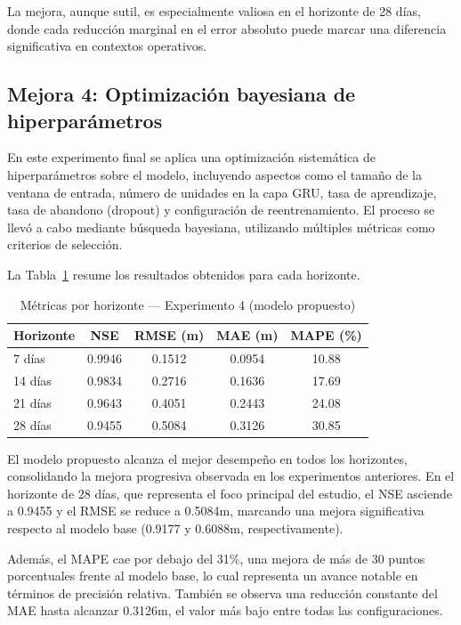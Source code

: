 La mejora, aunque sutil, es especialmente valiosa en el horizonte de 28 días, donde cada reducción marginal en el error absoluto puede marcar una diferencia significativa en contextos operativos.


\subsection{Mejora 4: Optimización bayesiana de hiperparámetros}
\label{ssec:exp4}

En este experimento final se aplica una optimización sistemática de hiperparámetros sobre el modelo, incluyendo aspectos como el tamaño de la ventana de entrada, número de unidades en la capa GRU, tasa de aprendizaje, tasa de abandono (dropout) y configuración de reentrenamiento. El proceso se llevó a cabo mediante búsqueda bayesiana, utilizando múltiples métricas como criterios de selección.

La Tabla~\ref{tab:exp4_metricas_horizontes} resume los resultados obtenidos para cada horizonte.

\begin{table}[H]
\centering
\caption{Métricas por horizonte — Experimento 4 (modelo propuesto)}
\label{tab:exp4_metricas_horizontes}
\begin{tabular}{lcccc}
\toprule
\textbf{Horizonte} & \textbf{NSE} & \textbf{RMSE (m)} & \textbf{MAE (m)} & \textbf{MAPE (\%)} \\
\midrule
7 días  & 0.9946 & 0.1512 & 0.0954 & 10.88 \\
14 días & 0.9834 & 0.2716 & 0.1636 & 17.69 \\
21 días & 0.9643 & 0.4051 & 0.2443 & 24.08 \\
28 días & 0.9455 & 0.5084 & 0.3126 & 30.85 \\
\bottomrule
\end{tabular}
\end{table}

El modelo propuesto alcanza el mejor desempeño en todos los horizontes, consolidando la mejora progresiva observada en los experimentos anteriores. En el horizonte de 28 días, que representa el foco principal del estudio, el NSE asciende a 0.9455 y el RMSE se reduce a 0.5084m, marcando una mejora significativa respecto al modelo base (0.9177 y 0.6088m, respectivamente).

Además, el MAPE cae por debajo del 31\%, una mejora de más de 30 puntos porcentuales frente al modelo base, lo cual representa un avance notable en términos de precisión relativa. También se observa una reducción constante del MAE hasta alcanzar 0.3126m, el valor más bajo entre todas las configuraciones.

